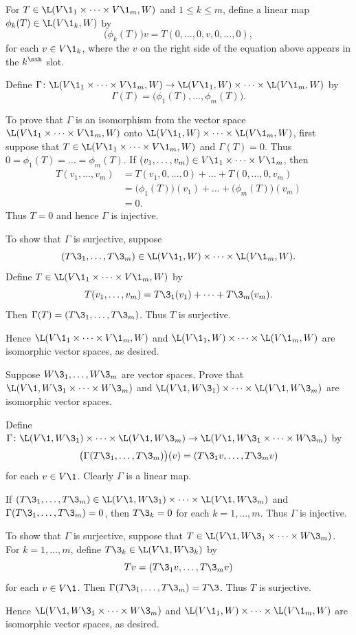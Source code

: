 \begin{Solution}
For $T \in \L(V\1_1 \times \dots \times V\1_m, W)$ and $1 \le k \le m$, define a linear map $\phi_k(T) \in \L(V\1_k, W)$ by
\[
\bigl(\phi_k(T)\bigr) v = T(0, \dots, 0, v, 0, \dots, 0),
\]
for each $v \in V\1_k$, where the $v$ on the right side of the equation above appears in the $k^\nth$ slot.

Define $\Gamma \colon \L(V\1_1 \times \dots \times V\1_m, W)\to \L(V\1_1, W) \times \dots \times \L(V\1_m, W)$ by
\[
\Gamma(T) = \bigl(\phi_1(T), \dots, \phi_m(T) \bigr).
\]

To prove that $\Gamma$ is an isomorphism from the vector space $\L(V\1_1 \times \dots \times V\1_m, W)$ onto
$\L(V\1_1, W) \times \dots \times \L(V\1_m, W)$, first suppose that $T \in \L(V\1_1 \times \dots \times V\1_m, W)$ and $\Gamma(T) = 0$. Thus $0 = \phi_1(T) = \dots = \phi_m(T)$. If $(v_1, \dots, v_m) \in V\1_1 \times \dots \times V\1_m$, then
\begin{align*}
T(v_1, \dots, v_m) &= T(v_1, 0, \dots, 0) + \dots + T(0, \dots, 0, v_m) \\
&= \bigl( \phi_1(T) \bigr)(v_1) + \dots + \bigl( \phi_m(T) \bigr)(v_m) \\
& = 0.
\end{align*}
Thus $T = 0$ and hence $\Gamma$ is injective.

To show that $\Gamma$ is surjective, suppose
\[
(T\3_1, \dots, T\3_m) \in \L(V\1_1, W) \times \dots \times \L(V\1_m, W).
\]
Define $T \in \L(V\1_1 \times \dots \times V\1_m, W)$ by
\[
T(v_1, \dots, v_m) = T\3_1(v_1) + \dots + T\3_m(v_m).
\]
Then $\Gamma(T) = (T\3_1, \dots, T\3_m)$. Thus $T$ is surjective.

Hence $\L(V\1_1 \times \dots \times V\1_m, W)$ and $\L(V\1_1, W) \times \dots \times \L(V\1_m, W)$ are isomorphic vector spaces, as desired.
\end{Solution}

\exercise
Suppose $W\3_1, \dots, W\3_m$ are vector spaces. Prove that $\L(V\1, W\3_1 \times \dots \times W\3_m)$ and
$\L(V\1, W\3_1) \times \dots \times \L(V\1, W\3_m)$ are isomorphic vector spaces.

\begin{Solution}
Define $\Gamma \colon \L(V\1, W\3_1) \times \dots \times \L(V\1, W\3_m) \to \L(V\1, W\3_1 \times \dots \times W\3_m)$ by
\[
\bigl( \Gamma(T\3_1, \dots, T\3_m) \bigr)(v) = (T\3_1v, \dots, T\3_mv)
\]
for each $v \in V\1$. Clearly $\Gamma$ is a linear map.

If $(T\3_1, \dots, T\3_m) \in \L(V\1, W\3_1) \times \dots \times \L(V\1, W\3_m)$ and $\Gamma(T\3_1, \dots, T\3_m) = 0$, then $T\3_k = 0$ for each $k = 1, \dots, m$. Thus $\Gamma$ is injective.

To show that $\Gamma$ is surjective, suppose that $T \in \L(V\1, W\3_1 \times \dots \times W\3_m)$. For $k = 1, \dots, m$, define $T\3_k \in \L(V\1, W\3_k)$ by
\[
Tv = (T\3_1v, \dots, T\3_mv)
\]
for each $v \in V\1$. Then $\Gamma(T\3_1, \dots, T\3_m) = T\3$. Thus $T$ is surjective.

Hence $\L(V\1, W\3_1 \times \dots \times W\3_m)$ and $\L(V\1_1, W) \times \dots \times \L(V\1_m, W)$ are isomorphic vector spaces, as desired.
\end{Solution}

